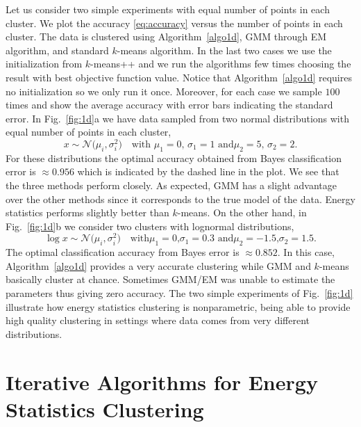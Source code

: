 \documentclass[aps,preprint,nofootinbib,floatfix]{revtex4-1}
\begin{document}
Let us consider two simple experiments with equal number of points
in each cluster. We plot the accuracy \eqref{eq:accuracy} versus the number
of points in each cluster.
The data is clustered using 
Algorithm~\ref{algo1d}, GMM through EM algorithm, and standard $k$-means 
algorithm. In the last two cases 
we use the initialization from $k$-means++ \cite{Vassilvitskii} 
and we run the algorithms
few times choosing the result with  best objective function value. 
Notice that Algorithm~\ref{algo1d} requires no initialization so we only
run it once.
Moreover, for each case we sample $100$ times
and show the average accuracy with error bars indicating
the standard error.
In  Fig.~\ref{fig:1d}a 
we have data sampled from two normal distributions with equal number of
points in each cluster,
\begin{equation}
\label{eq:two_normal}
x \sim \mathcal{N}\big(\mu_i,\sigma_i^2\big) 
\quad 
\mbox{with $\mu_1 = 0$, $\sigma_1=1$ and
$\mu_2 = 5$, $\sigma_2 = 2$.}
\end{equation}
For these distributions the optimal accuracy 
obtained from Bayes classification error
is $ \approx 0.956$ which is indicated by the dashed line in the plot.
We see that the three methods
perform closely. As expected, GMM has a slight advantage over the other
methods since
it corresponds to the true model of the data. 
Energy statistics performs slightly better
than $k$-means. On the other hand, in Fig.~\ref{fig:1d}b
we consider two clusters with lognormal distributions,
\begin{equation}
\label{eq:two_lognormal}
\log x \sim \mathcal{N}\big( \mu_i,\sigma_i^2\big) \quad
\mbox{with
$\mu_1 = 0$,
$\sigma_1 = 0.3$ and
$\mu_2 = -1.5$,
$\sigma_2 = 1.5$.}
\end{equation}
The optimal classification accuracy from Bayes error is $\approx 0.852$.
In this case,
Algorithm~\ref{algo1d} provides a very accurate clustering while
GMM and $k$-means basically cluster at chance.
Sometimes GMM/EM  was unable to estimate the parameters 
thus giving zero accuracy.
The two simple experiments of Fig.~\ref{fig:1d} illustrate
how energy statistics clustering is nonparametric, being able
to provide high quality clustering in settings where data comes
from very different distributions.


\section{Iterative Algorithms for Energy Statistics Clustering}
\label{sec:algo}
\end{document}
